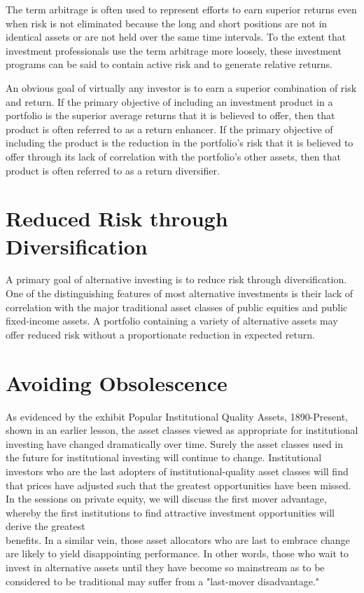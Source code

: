 \documentclass[11pt]{article}
\begin{document}
The term arbitrage is often used to represent efforts to earn superior returns even when risk is not eliminated because the long and short positions are not in identical assets or are not held over the same time intervals. To the extent that investment professionals use the term arbitrage more loosely, these investment programs can be said to contain active risk and to generate relative returns.

An obvious goal of virtually any investor is to earn a superior combination of risk and return. If the primary objective of including an investment product in a portfolio is the superior average returns that it is believed to offer, then that product is often referred to as a return enhancer. If the primary objective of including the product is the reduction in the portfolio's risk that it is believed to offer through its lack of correlation with the portfolio's other assets, then that product is often referred to as a return diversifier.

\section*{Reduced Risk through Diversification}
A primary goal of alternative investing is to reduce risk through diversification. One of the distinguishing features of most alternative investments is their lack of correlation with the major traditional asset classes of public equities and public fixed-income assets. A portfolio containing a variety of alternative assets may offer reduced risk without a proportionate reduction in expected return.

\section*{Avoiding Obsolescence}
As evidenced by the exhibit Popular Institutional Quality Assets, 1890-Present, shown in an earlier lesson, the asset classes viewed as appropriate for institutional investing have changed dramatically over time. Surely the asset classes used in the future for institutional investing will continue to change. Institutional investors who are the last adopters of institutional-quality asset classes will find that prices have adjusted such that the greatest opportunities have been missed. In the sessions on private equity, we will discuss the first mover advantage, whereby the first institutions to find attractive investment opportunities will derive the greatest\\
benefits. In a similar vein, those asset allocators who are last to embrace change are likely to yield disappointing performance. In other words, those who wait to invest in alternative assets until they have become so mainstream as to be considered to be traditional may suffer from a "last-mover disadvantage."
\end{document}
